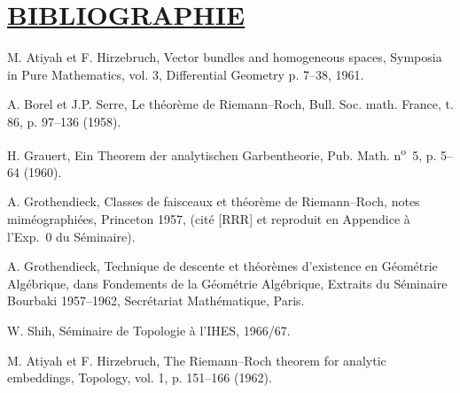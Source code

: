 \section*{\underline{BIBLIOGRAPHIE}}
\begin{enumerate}[label={[\arabic*]},leftmargin=2.5em]
\item M.
Atiyah et F. Hirzebruch, Vector bundles and homogeneous spaces, Symposia in Pure Mathematics, vol. 3, Differential Geometry p. 7--38, 1961.
\item A. Borel et J.P. Serre, Le th\'eor\`eme de Riemann--Roch, Bull. Soc. math. France, t. 86, p. 97--136 (1958).
\item H. Grauert, Ein Theorem der analytischen Garbentheorie, Pub. Math. n\textsuperscript{o}~5, p. 5--64 (1960).
\item A. Grothendieck, Classes de faisceaux et th\'eor\`eme de Riemann--Roch, notes mim\'eographi\'ees, Princeton 1957, (cit\'e [RRR] et reproduit en Appendice \`a l'Exp.\ 0 du S\'eminaire).
\item A. Grothendieck, Technique de descente et th\'eor\`emes d'existence en G\'eom\'etrie Alg\'ebrique, dans Fondements de la G\'eom\'etrie Alg\'ebrique, Extraits du S\'eminaire Bourbaki 1957--1962, Secr\'etariat Math\'ematique, Paris.
\item W. Shih, S\'eminaire de Topologie \`a l'IHES, 1966/67.
\item M. Atiyah et F. Hirzebruch, The Riemann--Roch theorem for analytic embeddings, Topology, vol. 1, p. 151--166 (1962).
\end{enumerate}



\clearpage



